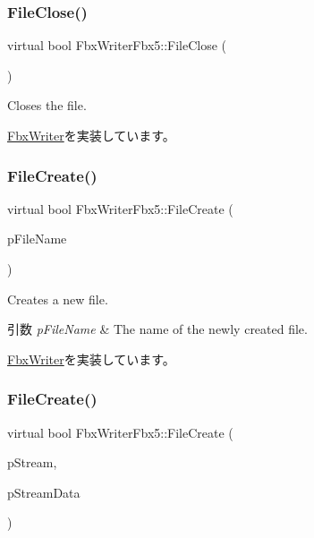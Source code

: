 \subsubsection{\texorpdfstring{File\+Close()}{FileClose()}}
{\footnotesize\ttfamily virtual bool Fbx\+Writer\+Fbx5\+::\+File\+Close (\begin{DoxyParamCaption}{ }\end{DoxyParamCaption})\hspace{0.3cm}{\ttfamily [virtual]}}

Closes the file. 

\hyperlink{class_fbx_writer_a0387142f55d0020fd5360759c12aa121}{Fbx\+Writer}を実装しています。

\mbox{\label{class_fbx_writer_fbx5_a8abe68065893c971afb6b01bffc6bcaf}} 
\subsubsection{\texorpdfstring{File\+Create()}{FileCreate()}\hspace{0.1cm}{\footnotesize\ttfamily [1/2]}}
{\footnotesize\ttfamily virtual bool Fbx\+Writer\+Fbx5\+::\+File\+Create (\begin{DoxyParamCaption}\item[{char $\ast$}]{p\+File\+Name }\end{DoxyParamCaption})\hspace{0.3cm}{\ttfamily [virtual]}}

Creates a new file. 
\begin{DoxyParams}{引数}
{\em p\+File\+Name} & The name of the newly created file. \\
\hline
\end{DoxyParams}


\hyperlink{class_fbx_writer_abe6729227cd6e3be5ee3ab0c1b8b0eda}{Fbx\+Writer}を実装しています。

\mbox{\label{class_fbx_writer_fbx5_aafb683508c3203a2516d8ba74ed32501}} 
\subsubsection{\texorpdfstring{File\+Create()}{FileCreate()}\hspace{0.1cm}{\footnotesize\ttfamily [2/2]}}
{\footnotesize\ttfamily virtual bool Fbx\+Writer\+Fbx5\+::\+File\+Create (\begin{DoxyParamCaption}\item[{\hyperlink{class_fbx_stream}{Fbx\+Stream} $\ast$}]{p\+Stream,  }\item[{void $\ast$}]{p\+Stream\+Data }\end{DoxyParamCaption})\hspace{0.3cm}{\ttfamily [virtual]}}

